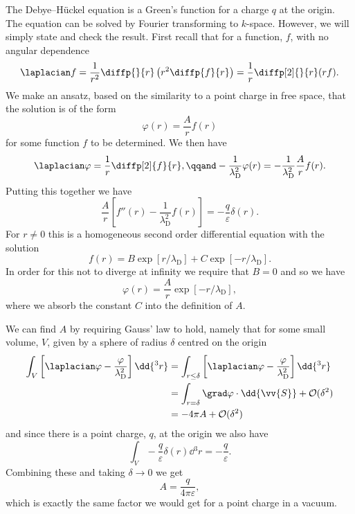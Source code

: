 \documentclass[fleqn]{NotesClass}
\newcommand*{\order}{\mathcal{O}}
\begin{document}
    The Debye--H\"uckel equation is a Green's function for a charge \(q\) at the origin.
    The equation can be solved by Fourier transforming to \(k\)-space.
    However, we will simply state and check the result.
    First recall that for a function, \(f\), with no angular dependence
    \begin{equation}
        \laplacian f = \frac{1}{r^2} \diffp{}{r}\left( r^2 \diffp{f}{r} \right) = \frac{1}{r} \diffp[2]{}{r} (rf).
    \end{equation}
    We make an ansatz, based on the similarity to a point charge in free space, that the solution is of the form
    \begin{equation}
        \varphi(r) = \frac{A}{r}f(r)
    \end{equation}
    for some function \(f\) to be determined.
    We then have
    \begin{equation}
        \laplacian\varphi = \frac{1}{r}\diffp[2]{f}{r}, \qqand -\frac{1}{\lambda_{\mathrm{D}}^2} \varphi(r) = -\frac{1}{\lambda_{\mathrm{D}}^2} \frac{A}{r}f(r).
    \end{equation}
    Putting this together we have
    \begin{equation}
        \frac{A}{r} \left[ f''(r) - \frac{1}{\lambda_{\mathrm{D}}^2} f(r) \right] = -\frac{q}{\varepsilon}\delta(r).
    \end{equation}
    For \(r \ne 0\) this is a homogeneous second order differential equation with the solution
    \begin{equation}
        f(r) = B\exp[r/\lambda_{\mathrm{D}}] + C\exp[-r/\lambda_{\mathrm{D}}].
    \end{equation}
    In order for this not to diverge at infinity we require that \(B = 0\) and so we have
    \begin{equation}
        \varphi(r) = \frac{A}{r}\exp[-r/\lambda_{\mathrm{D}}],
    \end{equation}
    where we absorb the constant \(C\) into the definition of \(A\).
    
    We can find \(A\) by requiring Gauss' law to hold, namely that for some small volume, \(V\), given by a sphere of radius \(\delta\) centred on the origin
    \begin{align}
        \int_V \left[ \laplacian \varphi - \frac{\varphi}{\lambda_{\mathrm{D}}^2} \right] \dd{^3r} &= \int_{r \le \delta} \left[ \laplacian \varphi - \frac{\varphi}{\lambda_{\mathrm{D}}^2} \right] \dd{^3r}\\
        &= \int_{r = \delta} \grad \varphi \cdot \dd{\vv{S}} + \order(\delta^2)\\
        &= -4\pi A + \order(\delta^2)
    \end{align}
    and since there is a point charge, \(q\), at the origin we also have
    \begin{equation}
        \int_V -\frac{q}{\varepsilon}\delta(r) \dd{^3r} = -\frac{q}{\varepsilon}.
    \end{equation}
    Combining these and taking \(\delta \to 0\) we get
    \begin{equation}
        A = \frac{q}{4\pi\varepsilon},
    \end{equation}
    which is exactly the same factor we would get for a point charge in a vacuum.
    
\end{document}

